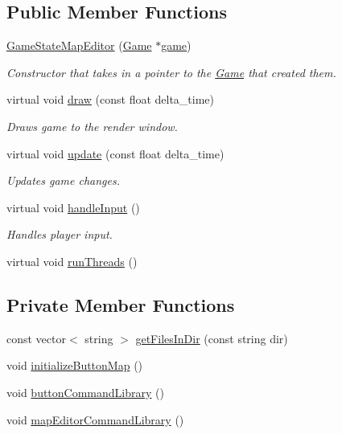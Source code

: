 \subsection*{Public Member Functions}
\begin{DoxyCompactItemize}
\item 
\hyperlink{class_game_state_map_editor_a621caf097a99b645b29729ac5bff3426}{Game\+State\+Map\+Editor} (\hyperlink{class_game}{Game} $\ast$\hyperlink{class_game_state_a355a79415b9ef63c2aec1448a99f6e71}{game})
\begin{DoxyCompactList}\small\item\em Constructor that takes in a pointer to the \hyperlink{class_game}{Game} that created them. \end{DoxyCompactList}\item 
virtual void \hyperlink{class_game_state_map_editor_a37c87643309459ac32d0b5f608bc93b0}{draw} (const float delta\+\_\+time)
\begin{DoxyCompactList}\small\item\em Draws game to the render window. \end{DoxyCompactList}\item 
virtual void \hyperlink{class_game_state_map_editor_afc6fb92c082c138e86f295b99aad2ddf}{update} (const float delta\+\_\+time)
\begin{DoxyCompactList}\small\item\em Updates game changes. \end{DoxyCompactList}\item 
virtual void \hyperlink{class_game_state_map_editor_ad8bd50d8a9823c26a57d315a6b303b88}{handle\+Input} ()
\begin{DoxyCompactList}\small\item\em Handles player input. \end{DoxyCompactList}\item 
virtual void \hyperlink{class_game_state_map_editor_a82ca3024c962b254ebdedcaa6ce5c1a8}{run\+Threads} ()
\end{DoxyCompactItemize}
\subsection*{Private Member Functions}
\begin{DoxyCompactItemize}
\item 
const vector$<$ string $>$ \hyperlink{class_game_state_map_editor_aa809c2e4d27cc2028f98790278459ae2}{get\+Files\+In\+Dir} (const string dir)
\item 
void \hyperlink{class_game_state_map_editor_ae144185a0fb6138d8381ea6a70c94dcd}{initialize\+Button\+Map} ()
\item 
void \hyperlink{class_game_state_map_editor_a3f2343fe7da91481f928ef9e9061458b}{button\+Command\+Library} ()
\item 
void \hyperlink{class_game_state_map_editor_aab39f5d619995539f39f9cd217130653}{map\+Editor\+Command\+Library} ()
\end{DoxyCompactItemize}
